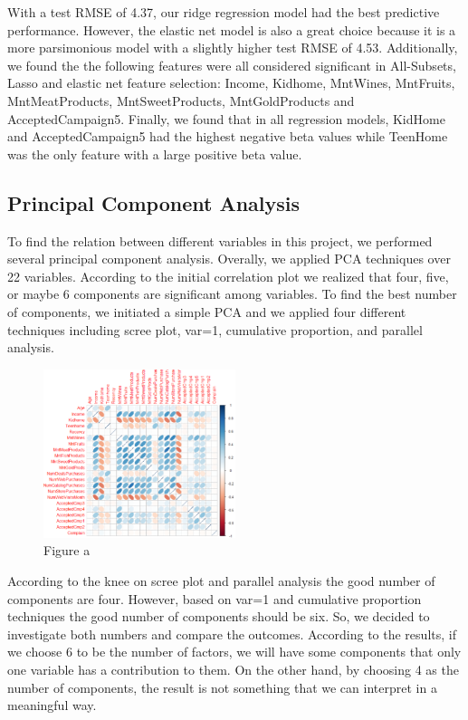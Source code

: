 \documentclass[11pt]{article} %
\begin{document}
\quad With a test RMSE of 4.37, our ridge regression model had the best predictive performance. However, the elastic net model is also a great choice because it is a more parsimonious model with a slightly higher test RMSE of 4.53. Additionally, we found the the following features were all considered significant in All-Subsets, Lasso and elastic net feature selection: Income, Kidhome, MntWines, MntFruits, MntMeatProducts, MntSweetProducts, MntGoldProducts and AcceptedCampaign5. Finally, we found that in all regression models, KidHome and AcceptedCampaign5 had the highest negative beta values while TeenHome was the only feature with a large positive beta value. 

\subsection{Principal Component Analysis}

\quad To find the relation between different variables in this project, we performed several principal component analysis. Overally, we applied PCA techniques over 22 variables. According to the initial correlation plot we realized that four, five, or maybe 6 components are significant among variables. To find the best number of components, we initiated a simple PCA and we applied four different techniques including scree plot, var=1, cumulative proportion, and parallel analysis. 

\begin{figure}[H]
    \centering
    \includegraphics[width=0.5\textwidth]{Maild/m-t2-1.png}
    \caption{Figure a}
    \label{fig:foobar}
\end{figure}

\quad According to the knee on scree plot and parallel analysis the good number of components are four. However, based on var=1 and cumulative proportion techniques the good number of components should be six. So, we decided to investigate both numbers and compare the outcomes. According to the results, if we choose 6 to be the number of factors, we will have some components that only one variable has a contribution to them. On the other hand, by choosing 4 as the number of components, the result is not something that we can interpret in a meaningful way. 
\end{document}
